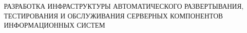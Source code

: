\documentclass[a4paper,12pt]{article} %
\begin{document}
РАЗРАБОТКА ИНФРАСТРУКТУРЫ АВТОМАТИЧЕСКОГО РАЗВЕРТЫВАНИЯ, ТЕСТИРОВАНИЯ И ОБСЛУЖИВАНИЯ СЕРВЕРНЫХ КОМПОНЕНТОВ ИНФОРМАЦИОННЫХ СИСТЕМ
\tableofcontents
\newpage

\newpage

\newpage

\end{document}

